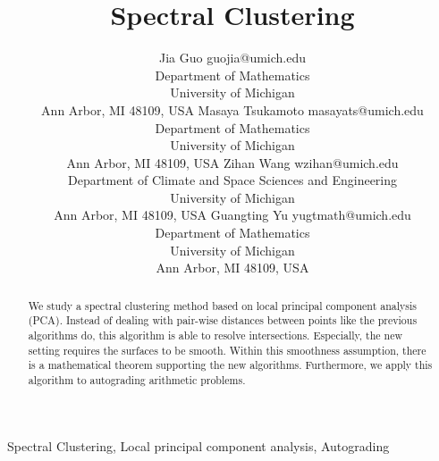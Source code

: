 \documentclass[twoside,11pt]{article}
\begin{document}
\title{Spectral Clustering}

\author{\name Jia Guo \email guojia@umich.edu \\
        \addr Department of Mathematics\\
        University of Michigan\\
        Ann Arbor, MI 48109, USA
        \AND
        \name Masaya Tsukamoto \email masayats@umich.edu \\
        \addr Department of Mathematics\\
        University of Michigan\\
        Ann Arbor, MI 48109, USA
        \AND
        \name Zihan Wang \email wzihan@umich.edu \\
        \addr Department of Climate and Space Sciences and Engineering\\
        University of Michigan\\
        Ann Arbor, MI 48109, USA
        \AND
        \name Guangting Yu \email yugtmath@umich.edu \\
        \addr Department of Mathematics\\
        University of Michigan\\
        Ann Arbor, MI 48109, USA}


\maketitle

\begin{abstract}
We study a spectral clustering method based on local principal component analysis (PCA).
Instead of dealing with pair-wise distances between points like the previous algorithms do, this algorithm is able to resolve intersections.
Especially, the new setting requires the surfaces to be smooth.
Within this smoothness assumption, there is a mathematical theorem supporting the new algorithms.
Furthermore, we apply this algorithm to autograding arithmetic problems.
\end{abstract}

\begin{keywords}
Spectral Clustering, Local principal component analysis, Autograding
\end{keywords}


\end{document}
